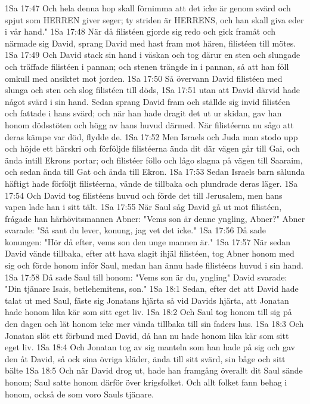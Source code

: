 1Sa 17:47  Och hela denna hop skall förnimma att det icke är genom svärd och spjut som HERREN giver seger; ty striden är HERRENS, och han skall giva eder i vår hand."
1Sa 17:48  När då filistéen gjorde sig redo och gick framåt och närmade sig David, sprang David med hast fram mot hären, filistéen till mötes.
1Sa 17:49  Och David stack sin hand i väskan och tog därur en sten och slungade och träffade filistéen i pannan; och stenen trängde in i pannan, så att han föll omkull med ansiktet mot jorden.
1Sa 17:50  Så övervann David filistéen med slunga och sten och slog filistéen till döds,
1Sa 17:51  utan att David därvid hade något svärd i sin hand. Sedan sprang David fram och ställde sig invid filistéen och fattade i hans svärd; och när han hade dragit det ut ur skidan, gav han honom dödsstöten och högg av hans huvud därmed. När filistéerna nu sågo att deras kämpe var död, flydde de.
1Sa 17:52  Men Israels och Juda man stodo upp och höjde ett härskri och förföljde filistéerna ända dit där vägen går till Gai, och ända intill Ekrons portar; och filistéer föllo och lågo slagna på vägen till Saaraim, och sedan ända till Gat och ända till Ekron.
1Sa 17:53  Sedan Israels barn sålunda häftigt hade förföljt filistéerna, vände de tillbaka och plundrade deras läger.
1Sa 17:54  Och David tog filistéens huvud och förde det till Jerusalem, men hans vapen lade han i sitt tält.
1Sa 17:55  När Saul såg David gå ut mot filistéen, frågade han härhövitsmannen Abner: "Vems son är denne yngling, Abner?" Abner svarade: "Så sant du lever, konung, jag vet det icke."
1Sa 17:56  Då sade konungen: "Hör då efter, vems son den unge mannen är."
1Sa 17:57  När sedan David vände tillbaka, efter att hava slagit ihjäl filistéen, tog Abner honom med sig och förde honom inför Saul, medan han ännu hade filistéens huvud i sin hand.
1Sa 17:58  Då sade Saul till honom: "Vems son är du, yngling" David svarade: "Din tjänare Isais, betlehemitens, son."
1Sa 18:1  Sedan, efter det att David hade talat ut med Saul, fäste sig Jonatans hjärta så vid Davids hjärta, att Jonatan hade honom lika kär som sitt eget liv.
1Sa 18:2  Och Saul tog honom till sig på den dagen och lät honom icke mer vända tillbaka till sin faders hus.
1Sa 18:3  Och Jonatan slöt ett förbund med David, då han nu hade honom lika kär som sitt eget liv.
1Sa 18:4  Och Jonatan tog av sig manteln som han hade på sig och gav den åt David, så ock sina övriga kläder, ända till sitt svärd, sin båge och sitt bälte
1Sa 18:5  Och när David drog ut, hade han framgång överallt dit Saul sände honom; Saul satte honom därför över krigsfolket. Och allt folket fann behag i honom, också de som voro Sauls tjänare.

